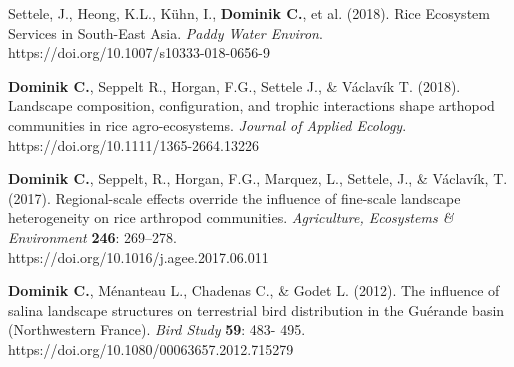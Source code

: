
\begin{cvparagraph}

 \vspace{.5\baselineskip} 
 Settele, J., Heong, K.L., Kühn, I., \textbf{Dominik C.}, et al. (2018). Rice Ecosystem Services in South-East Asia. \textit{Paddy Water Environ}. \\ https://doi.org/10.1007/s10333-018-0656-9
    
\textbf{Dominik C.}, Seppelt R., Horgan, F.G., Settele J., \& Václavík T. (2018). Landscape composition, configuration, and trophic interactions shape arthopod communities in rice agro-ecosystems. \textit{Journal of Applied Ecology}. \\https://doi.org/10.1111/1365-2664.13226  

\textbf{Dominik C.}, Seppelt, R., Horgan, F.G., Marquez, L., Settele, J., \& Václavík, T. (2017). Regional-scale effects override the influence of fine-scale landscape heterogeneity on rice arthropod communities. \textit{Agriculture, Ecosystems \& Environment} \textbf{246}: 269–278. \\https://doi.org/10.1016/j.agee.2017.06.011

\textbf{Dominik C.}, Ménanteau L., Chadenas C., \& Godet L. (2012). The influence of salina landscape structures on terrestrial bird distribution in the Guérande basin (Northwestern France). \textit{Bird Study} \textbf{59}: 483- 495. \\https://doi.org/10.1080/00063657.2012.715279
\end{cvparagraph}



